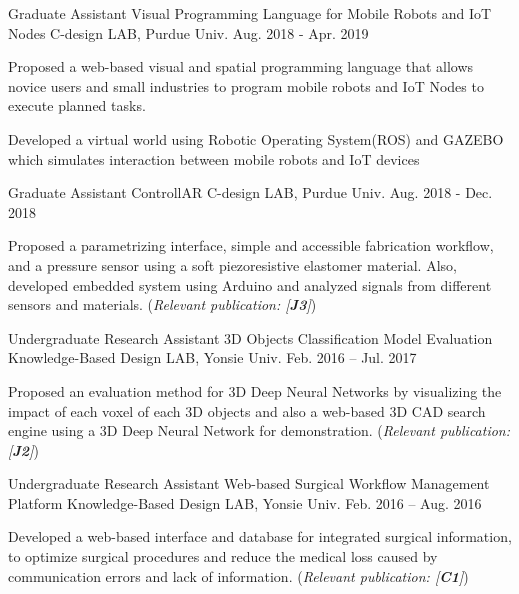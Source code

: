 \begin{cventries}

\cventry
{Graduate Assistant} %
{Visual Programming Language for Mobile Robots and IoT Nodes} %
{C-design LAB, Purdue Univ.} %
{Aug. 2018 - Apr. 2019} %
{ %
\begin{cvitems}
\item {Proposed a web-based visual and spatial programming language that allows novice users and small industries to program mobile robots and IoT Nodes to execute planned tasks.}
\item {Developed a virtual world using Robotic Operating System(ROS) and GAZEBO which simulates interaction between mobile robots and IoT devices}
\end{cvitems} 
}


\cventry
{Graduate Assistant} %
{ControllAR} %
{C-design LAB, Purdue Univ.} %
{Aug. 2018 - Dec. 2018} %
{ %
\begin{cvitems}
\item {Proposed a parametrizing interface, simple and accessible fabrication workflow, and a pressure sensor using a soft piezoresistive elastomer material. Also, developed embedded system using Arduino and analyzed signals from different sensors and materials. (\textit{Relevant publication: [\textbf{J3}]})}
\end{cvitems}
}


\cventry
{Undergraduate Research Assistant} %
{3D Objects Classification Model Evaluation} %
{Knowledge-Based Design LAB, Yonsie Univ.} %
{Feb. 2016 – Jul. 2017} %
{ %
\begin{cvitems}
\item {Proposed an evaluation method for 3D Deep Neural Networks by visualizing the impact of each voxel of each 3D objects and also a web-based 3D CAD search engine using a 3D Deep Neural Network for demonstration. (\textit{Relevant publication: [\textbf{J2}]})}
\end{cvitems}
}

\cventry
{Undergraduate Research Assistant} %
{Web-based Surgical Workflow Management Platform} %
{Knowledge-Based Design LAB, Yonsie Univ.} %
{Feb. 2016 – Aug. 2016} %
{ %
\begin{cvitems}
\item {Developed a web-based interface and database for integrated surgical information, to optimize surgical procedures and reduce the medical loss caused by communication errors and lack of information. (\textit{Relevant publication: [\textbf{C1}]})}
\end{cvitems}
}

\end{cventries}